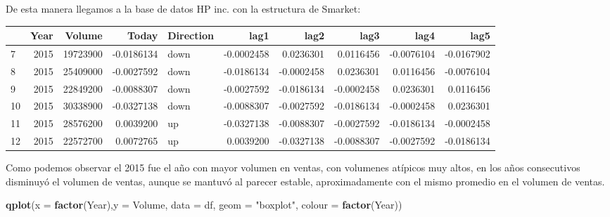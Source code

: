 \documentclass[
]{article}
\newenvironment{Shaded}{\begin{snugshade}}{\end{snugshade}}
\newcommand{\DataTypeTok}[1]{\textcolor[rgb]{0.13,0.29,0.53}{#1}}
\newcommand{\DecValTok}[1]{\textcolor[rgb]{0.00,0.00,0.81}{#1}}
\newcommand{\KeywordTok}[1]{\textcolor[rgb]{0.13,0.29,0.53}{\textbf{#1}}}
\newcommand{\NormalTok}[1]{#1}
\newcommand{\OperatorTok}[1]{\textcolor[rgb]{0.81,0.36,0.00}{\textbf{#1}}}
\newcommand{\StringTok}[1]{\textcolor[rgb]{0.31,0.60,0.02}{#1}}
\begin{document}
De esta manera llegamos a la base de datos HP inc. con la estructura de
Smarket:

\begin{Shaded}
\end{Shaded}

\begin{table}[H]
\centering
\begin{tabular}[t]{l|r|r|r|l|r|r|r|r|r}
\hline
  & Year & Volume & Today & Direction & lag1 & lag2 & lag3 & lag4 & lag5\\
\hline
7 & 2015 & 19723900 & -0.0186134 & down & -0.0002458 & 0.0236301 & 0.0116456 & -0.0076104 & -0.0167902\\
\hline
8 & 2015 & 25409000 & -0.0027592 & down & -0.0186134 & -0.0002458 & 0.0236301 & 0.0116456 & -0.0076104\\
\hline
9 & 2015 & 22849200 & -0.0088307 & down & -0.0027592 & -0.0186134 & -0.0002458 & 0.0236301 & 0.0116456\\
\hline
10 & 2015 & 30338900 & -0.0327138 & down & -0.0088307 & -0.0027592 & -0.0186134 & -0.0002458 & 0.0236301\\
\hline
11 & 2015 & 28576200 & 0.0039200 & up & -0.0327138 & -0.0088307 & -0.0027592 & -0.0186134 & -0.0002458\\
\hline
12 & 2015 & 22572700 & 0.0072765 & up & 0.0039200 & -0.0327138 & -0.0088307 & -0.0027592 & -0.0186134\\
\hline
\end{tabular}
\end{table}

Como podemos observar el 2015 fue el año con mayor volumen en ventas,
con volumenes atípicos muy altos, en los años consecutivos disminuyó el
volumen de ventas, aunque se mantuvó al parecer estable, aproximadamente
con el mismo promedio en el volumen de ventas.

\begin{Shaded}
\begin{Highlighting}[]
\KeywordTok{qplot}\NormalTok{(}\DataTypeTok{x =} \KeywordTok{factor}\NormalTok{(Year),}\DataTypeTok{y =}\NormalTok{ Volume, }\DataTypeTok{data =}\NormalTok{ df, }\DataTypeTok{geom =} \StringTok{"boxplot"}\NormalTok{, }\DataTypeTok{colour =} \KeywordTok{factor}\NormalTok{(Year))}
\end{Highlighting}
\end{Shaded}
\end{document}
